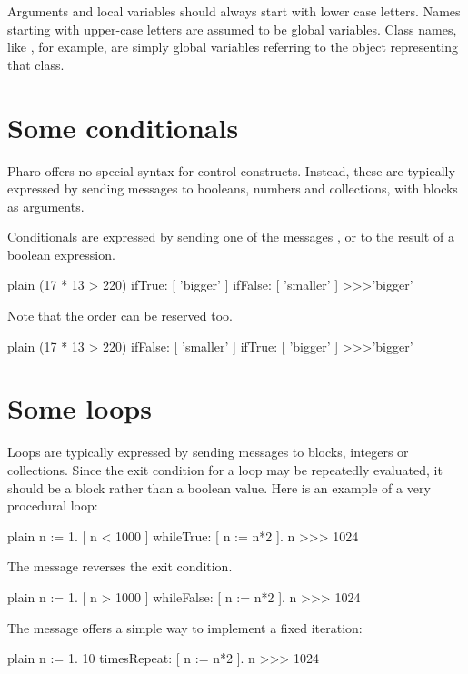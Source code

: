 \documentclass[10pt,twoside,english]{_support/latex/sbabook/sbabook}
\begin{document}
Arguments and local variables should always start with lower case letters. Names
starting with upper-case letters are assumed to be global variables. Class
names, like , for example, are simply global variables referring to
the object representing that class.
\section{Some conditionals}
Pharo offers no special syntax for control constructs. Instead, these are
typically expressed by sending messages to booleans, numbers and collections,
with blocks as arguments.

Conditionals are expressed by sending one of the messages ,
 or  to the result of a boolean expression. 

\begin{displaycode}{plain}
(17 * 13 > 220)
	ifTrue: [ 'bigger' ]
	ifFalse: [ 'smaller' ] 
>>>'bigger'
\end{displaycode}

Note that the order can be reserved too.

\begin{displaycode}{plain}
(17 * 13 > 220)
	ifFalse: [ 'smaller' ]
	ifTrue: [ 'bigger' ]
>>>'bigger'
\end{displaycode}
\section{Some loops}
Loops are typically expressed by sending messages to blocks, integers or
collections. Since the exit condition for a loop may be repeatedly evaluated, it
should be a block rather than a boolean value. Here is an example of a very
procedural loop:

\begin{displaycode}{plain}
n := 1.
[ n < 1000 ] whileTrue: [ n := n*2 ].
n 
>>> 1024
\end{displaycode}

The message  reverses the exit condition.

\begin{displaycode}{plain}
n := 1.
[ n > 1000 ] whileFalse: [ n := n*2 ].
n 
>>> 1024
\end{displaycode}

The message  offers a simple way to implement a fixed iteration:

\begin{displaycode}{plain}
n := 1.
10 timesRepeat: [ n := n*2 ].
n 
>>> 1024
\end{displaycode}
\end{document}
